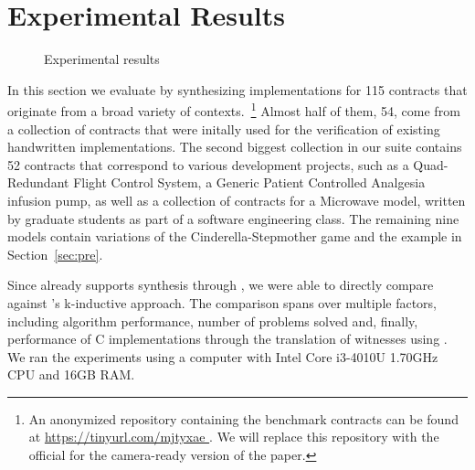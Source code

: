 \section{Experimental Results}
\label{sec:results}

\begin{figure}[!t]
\centering
{}


\caption{Experimental results}
\label{fg:results}
\end{figure}

In this section we evaluate \jsynvg by synthesizing implementations
for 115 contracts that originate from a broad variety of contexts.~\footnote{An
anonymized repository containing the benchmark contracts can be found at
\url{https://tinyurl.com/mjtyxae }. We will replace this repository with the official for the camera-ready
version of the paper.} Almost half of them, 54, come from a collection of contracts that were initally used for the verification of existing handwritten implementations. The second biggest collection in our suite contains 52 contracts that correspond to various development projects, such as a Quad-Redundant Flight Control System, a Generic Patient Controlled Analgesia infusion pump, as well as a collection of contracts
for a Microwave model, written by graduate students as part of a software
engineering class. The remaining nine models contain variations of the
Cinderella-Stepmother game and the example in Section~\ref{sec:pre}.

Since \jkind already supports synthesis through \jsyn, we were able to directly
compare \jsynvg against \jsyn's k-inductive approach.
The comparison spans over multiple factors, including
algorithm performance, number of problems solved and, finally, performance
of C implementations through the translation of witnesses using \smtlibtoc. We
ran the experiments using a computer with Intel Core i3-4010U 1.70GHz CPU and
16GB RAM.

